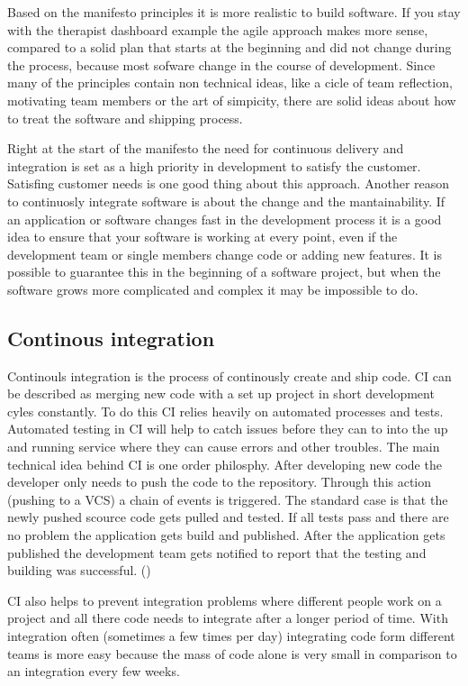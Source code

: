 Based on the manifesto principles it is more realistic to build software. If you stay with the therapist dashboard example the agile approach makes more
sense, compared to a solid plan that starts at the beginning and did not change during the process, because most sofware change in the course of
development. Since many of the principles contain non technical ideas, like a cicle of team reflection, motivating team members or the art of simpicity,
there are solid ideas about how to treat the software and shipping process.

Right at the start of the manifesto the need for continuous delivery and integration is set as a high priority in development to satisfy the customer.
Satisfing customer needs is one good thing about this approach. Another reason to continuosly integrate software is about the change and the mantainability.
If an application or software changes fast in the development process it is a good idea to ensure that your software is working at every point,
even if the development team or single members change code or adding new features. It is possible to guarantee this in the beginning of a software project,
but when the software grows more complicated and complex it may be impossible to do.


\subsection{Continous integration}
Continouls integration is the process of continously create and ship code. CI can be described as merging new code with a set up project in short
development cyles constantly. To do this CI relies heavily on automated processes and tests. Automated testing in CI will help to catch issues before they
can to into the up and running service where they can cause errors and other troubles. The main technical idea behind CI is
one order philosphy. After developing new code the developer only needs to push the code to the repository. Through this action (pushing to a VCS) a chain
of events is triggered. The standard case is that the newly pushed scource code gets pulled and tested. If all tests pass and there are no problem the
application gets build and published. After the application gets published the development team gets notified to report that the testing and building was
successful. (\cite{stolberg2009enabling})

CI also helps to prevent integration problems where different people work on a project and all there code needs to integrate after a longer period of time.
With integration often (sometimes a few times per day) integrating code form different teams is more easy because the mass of code alone is very small in
comparison to an integration every few weeks.


